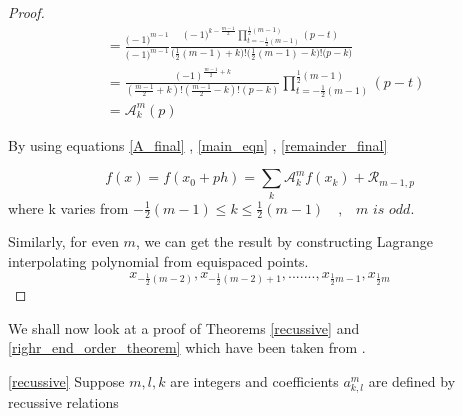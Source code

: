 \documentclass[../document.tex]{subfiles}
\begin{document}
\begin{appendices}
\begin{proof}
			\begin{equation} \label{A_final}
				\begin{split}
					&=
					\frac{
						\Big(  -1  \Big)^{m-1}    
					}{
						\Big(  -1  \Big)^{m-1}    
					}
					\frac{
						\Big(  -1  \Big)^{k-\frac{m-1}{2}}    
						\prod_{t = -\frac{1}{2}(m-1) }^{\frac{1}{2}(m-1)}  (p-t)
					}{
						\Big( \frac{1}{2}(m-1) +k \Big)! 
						\Big( \frac{1}{2}(m-1) -k \Big)! 
						\Big( p - k \Big)
					}
					\\
					&=
					\frac{ (-1)^{\frac{m-1}{2}+k} }{
						(\frac{m-1}{2} + k)!
						(\frac{m-1}{2} - k)!
						(p-k)}
					\prod_{t = -\frac{1}{2}(m-1) }^{\frac{1}{2}(m-1)}  (p-t)
					\\
					&=
					\mathcal{A}_{k}^{m}(p)
				\end{split}
			\end{equation}
			
			By using equations \ref{A_final} , \ref{main_eqn} , \ref{remainder_final}
			
			$$
			f(x) = f(x_0 + ph) = \sum_{k} \mathcal{A}_{k}^{m} f(x_k) + \mathcal{R}_{m-1,p}
			$$
			where k varies from $-\frac{1}{2}(m-1) \leq k \leq \frac{1}{2}(m-1)  \quad  \textit{,} \quad
			\textit{m is odd} $.
			\vspace{5mm}
			
			
			Similarly, for even $m$, we can get the result by constructing Lagrange interpolating polynomial from equispaced points. 
			$$
			x_{-\frac{1}{2}(m-2)} , x_{-\frac{1}{2}(m-2)+1} , .......
			, x_{\frac{1}{2}m-1} , x_{\frac{1}{2}m}
			$$
			
		\end{proof}
		\pagebreak
		We shall now look at a proof of Theorems \ref{recussive} and \ref{righr_end_order_theorem} which have been taken from \cite{kapur1997high}.
		
		
		\begin{customthm}{\ref{recussive}}   
			Suppose $m,l,k$ are integers and coefficients $a^{m}_{k,l}$ are defined by recussive relations
			

\end{customthm}
\end{appendices}
\end{document}
